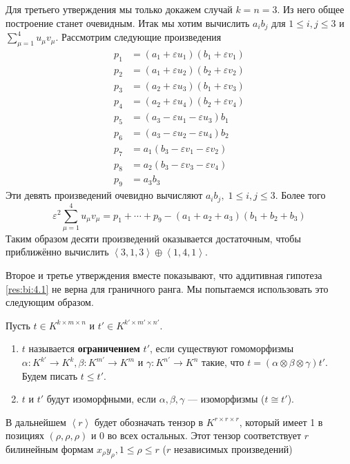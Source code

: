 Для третьего утверждения мы только докажем случай $k=n=3$. Из него общее построение станет очевидным. Итак мы хотим вычислить $a_i b_j$ для $1 \leq i,j \leq 3$ и $\sum_{\mu=1}^4 u_{\mu} v_{\mu}$. Рассмотрим следующие произведения
\begin{align*}
  p_1 & = (a_1 + \varepsilon u_1)(b_1 + \varepsilon v_1)\\
  p_2 & = (a_1 + \varepsilon u_2)(b_2 + \varepsilon v_2)\\
  p_3 & = (a_2 + \varepsilon u_3)(b_1 + \varepsilon v_3)\\    
  p_4 & = (a_2 + \varepsilon u_4)(b_2 + \varepsilon v_4)\\
  p_5 & = (a_3 - \varepsilon u_1 - \varepsilon u_3)b_1\\
  p_6 & = (a_3 - \varepsilon u_2 - \varepsilon u_4)b_2\\
  p_7 & = a_1 (b_3 - \varepsilon v_1 - \varepsilon v_2)\\
  p_8 & = a_2 (b_3 - \varepsilon v_3 - \varepsilon v_4)\\
  p_9 & = a_3 b_3
\end{align*}
Эти девять произведений очевидно вычисляют $a_i b_j, \; 1 \leq i,j \leq 3$. Более того
\[
	\varepsilon^2 \sum_{\mu=1}^4 u_{\mu} v_{\mu} = p_1 + \dotsb + p_9 - (a_1 + a_2 + a_3)(b_1 + b_2 + b_3)
\]
Таким образом десяти произведений оказывается достаточным, чтобы приближённо вычислить $\left\langle 3,1,3 \right\rangle \oplus \left\langle 1,4,1 \right\rangle$.

Второе и третье утверждения вместе показывают, что аддитивная гипотеза \ref{res:bi:4.1} не верна для граничного ранга. Мы попытаемся использовать это следующим образом.

\begin{definition}\label{def:bi:6.2}
     Пусть $t \in K^{k \times m \times n}$ и $t' \in K^{k' \times m' \times n'}$.
	\begin{enumerate}
	     \item $t$ называется \textbf{ограничением} $t'$, если существуют гомоморфизмы $\alpha: K^{k'} \to K^{k}, \beta: K^{m'} \to K^{m}$ и $\gamma: K^{n'} \to K^{n}$ такие, что $t = (\alpha \otimes \beta \otimes \gamma)t'$. Будем писать $t \leq t'$.
	     \item $t$ и $t'$ будут изоморфными, если $\alpha, \beta, \gamma$ --- изоморфизмы ($t \cong t'$).
	\end{enumerate}
\end{definition}

В дальнейшем $\left\langle r \right\rangle$ будет обозначать тензор в $K^{r \times r \times r}$, который имеет 1 в позициях $(\rho, \rho, \rho)$ и 0 во всех остальных. Этот тензор соответствует $r$ билинейным формам $x_{\rho} y_{\rho}, 1 \leq \rho \leq r$ ($r$ независимых произведений)

